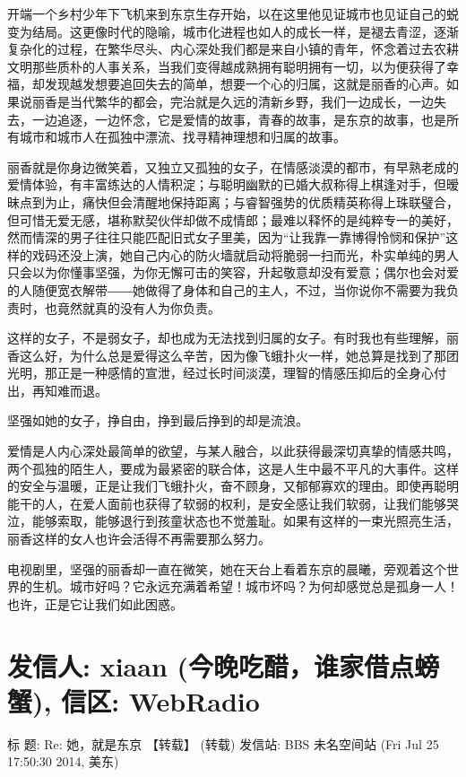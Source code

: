 \documentclass[12pt]{book}
\begin{document}
开端一个乡村少年下飞机来到东京生存开始，以在这里他见证城市也见证自己的蜕变为结局。这更像时代的隐喻，城市化进程也如人的成长一样，是褪去青涩，逐渐复杂化的过程，在繁华尽头、内心深处我们都是来自小镇的青年，怀念着过去农耕文明那些质朴的人事关系，当我们变得越成熟拥有聪明拥有一切，以为便获得了幸福，却发现越发想要追回失去的简单，想要一个心的归属，这就是丽香的心声。如果说丽香是当代繁华的都会，完治就是久远的清新乡野，我们一边成长，一边失去，一边追逐，一边怀念，它是爱情的故事，青春的故事，是东京的故事，也是所有城市和城市人在孤独中漂流、找寻精神理想和归属的故事。

丽香就是你身边微笑着，又独立又孤独的女子，在情感淡漠的都市，有早熟老成的爱情体验，有丰富练达的人情积淀；与聪明幽默的已婚大叔称得上棋逢对手，但暧昧点到为止，痛快但会清醒地保持距离；与睿智强势的优质精英称得上珠联璧合，但可惜无爱无感，堪称默契伙伴却做不成情郎；最难以释怀的是纯粹专一的美好，然而情深的男子往往只能匹配旧式女子里美，因为“让我靠一靠博得怜悯和保护”这样的戏码还没上演，她自己内心的防火墙就启动将脆弱一扫而光，朴实单纯的男人只会以为你懂事坚强，为你无懈可击的笑容，升起敬意却没有爱意；偶尔也会对爱的人随便宽衣解带――她做得了身体和自己的主人，不过，当你说你不需要为我负责时，也竟然就真的没有人为你负责。

这样的女子，不是弱女子，却也成为无法找到归属的女子。有时我也有些理解，丽香这么好，为什么总是爱得这么辛苦，因为像飞蛾扑火一样，她总算是找到了那团光明，那正是一种感情的宣泄，经过长时间淡漠，理智的情感压抑后的全身心付出，再知难而退。

坚强如她的女子，挣自由，挣到最后挣到的却是流浪。

爱情是人内心深处最简单的欲望，与某人融合，以此获得最深切真挚的情感共鸣，两个孤独的陌生人，要成为最紧密的联合体，这是人生中最不平凡的大事件。这样的安全与温暖，正是让我们飞蛾扑火，奋不顾身，又郁郁寡欢的理由。即使再聪明能干的人，在爱人面前也获得了软弱的权利，是安全感让我们软弱，让我们能够哭泣，能够索取，能够退行到孩童状态也不觉羞耻。如果有这样的一束光照亮生活，丽香这样的女人也许会活得不再需要那么努力。

电视剧里，坚强的丽香却一直在微笑，她在天台上看着东京的晨曦，旁观着这个世界的生机。城市好吗？它永远充满着希望！城市坏吗？为何却感觉总是孤身一人！也许，正是它让我们如此困惑。

\chapter{发信人: xiaan (今晚吃醋，谁家借点螃蟹), 信区: WebRadio}
\label{sec-45}
标  题: Re: 她，就是东京 【转载】 (转载)
发信站: BBS 未名空间站 (Fri Jul 25 17:50:30 2014, 美东)
\end{document}
